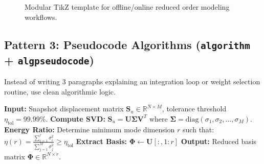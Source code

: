 \documentclass[12pt,a4paper]{article}
\begin{document}
\begin{figure}[htbp]
    \centering
    \caption{Modular TikZ template for offline/online reduced order modeling workflows.}
    \label{fig:tikz_workflow_template}
\end{figure}

\subsection{Pattern 3: Pseudocode Algorithms (\texttt{algorithm} + \texttt{algpseudocode})}
Instead of writing 3 paragraphs explaining an integration loop or weight selection routine, use clean algorithmic logic.

\begin{algorithm}[htbp]
\caption{POD Snapshot Extraction and Basis Truncation}
\label{alg:pod_extraction_pattern}
\begin{algorithmic}[1]
\State \textbf{Input:} Snapshot displacement matrix $\mathbf{S}_u \in \mathbb{R}^{N \times M}$, tolerance threshold $\eta_{\text{tol}} = 99.99\%$.
\State \textbf{Compute SVD:} $\mathbf{S}_u = \mathbf{U} \boldsymbol{\Sigma} \mathbf{V}^T$ where $\boldsymbol{\Sigma} = \text{diag}(\sigma_1, \sigma_2, \dots, \sigma_M)$.
\State \textbf{Energy Ratio:} Determine minimum mode dimension $r$ such that:
\State \quad $\eta(r) = \frac{\sum_{i=1}^r \sigma_i^2}{\sum_{j=1}^M \sigma_j^2} \ge \eta_{\text{tol}}$
\State \textbf{Extract Basis:} $\boldsymbol{\Phi} \leftarrow \mathbf{U}[:, 1:r]$
\State \textbf{Output:} Reduced basis matrix $\boldsymbol{\Phi} \in \mathbb{R}^{N \times r}$.
\end{algorithmic}
\end{algorithm}
\end{document}

